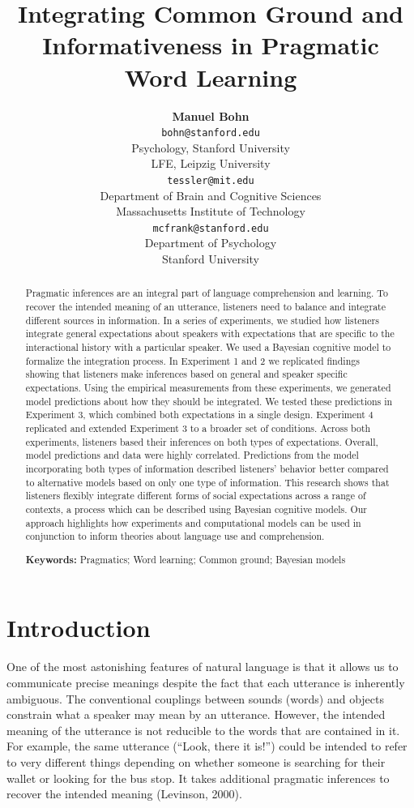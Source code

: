 \documentclass[10pt, letterpaper]{article}
\title{Integrating Common Ground and Informativeness in Pragmatic Word Learning}
\author{{\large \bf Manuel Bohn} \\ \texttt{bohn@stanford.edu} \\ Psychology, Stanford University \\ LFE, Leipzig University 
 \And {\large \bf Michael Henry Tessler} \\ \texttt{tessler@mit.edu} \\ Department of Brain and Cognitive Sciences \\ Massachusetts Institute of Technology
 \And {\large \bf Michael C. Frank} \\ \texttt{mcfrank@stanford.edu} \\ Department of Psychology \\ Stanford University}
\begin{document}
\maketitle

\begin{abstract}
Pragmatic inferences are an integral part of language comprehension and
learning. To recover the intended meaning of an utterance, listeners
need to balance and integrate different sources in information. In a
series of experiments, we studied how listeners integrate general
expectations about speakers with expectations that are specific to the
interactional history with a particular speaker. We used a Bayesian
cognitive model to formalize the integration process. In Experiment 1
and 2 we replicated findings showing that listeners make inferences
based on general and speaker specific expectations. Using the empirical
measurements from these experiments, we generated model predictions
about how they should be integrated. We tested these predictions in
Experiment 3, which combined both expectations in a single design.
Experiment 4 replicated and extended Experiment 3 to a broader set of
conditions. Across both experiments, listeners based their inferences on
both types of expectations. Overall, model predictions and data were
highly correlated. Predictions from the model incorporating both types
of information described listeners' behavior better compared to
alternative models based on only one type of information. This research
shows that listeners flexibly integrate different forms of social
expectations across a range of contexts, a process which can be
described using Bayesian cognitive models. Our approach highlights how
experiments and computational models can be used in conjunction to
inform theories about language use and comprehension.

\textbf{Keywords:}
Pragmatics; Word learning; Common ground; Bayesian models
\end{abstract}

\section{Introduction}\label{introduction}

One of the most astonishing features of natural language is that it
allows us to communicate precise meanings despite the fact that each
utterance is inherently ambiguous. The conventional couplings between
sounds (words) and objects constrain what a speaker may mean by an
utterance. However, the intended meaning of the utterance is not
reducible to the words that are contained in it. For example, the same
utterance (``Look, there it is!'') could be intended to refer to very
different things depending on whether someone is searching for their
wallet or looking for the bus stop. It takes additional pragmatic
inferences to recover the intended meaning (Levinson, 2000).
\end{document}
